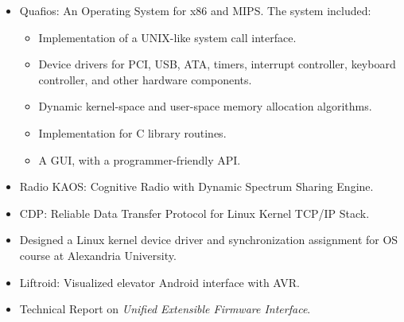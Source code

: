 \documentclass[letterpaper]{twentysecondcv} %
\begin{document}
\begin{itemize}
    \item{Quafios: An Operating System for x86 and MIPS. The system included:
          \begin{itemize}
            \item Implementation of a UNIX-like system call interface.
            \item Device drivers for PCI, USB, ATA, timers, interrupt controller, 
                  keyboard controller, and other hardware components.
            \item Dynamic kernel-space and user-space memory allocation algorithms.
            \item Implementation for C library routines.
            \item A GUI, with a programmer-friendly API.
          \end{itemize}
          }

    \item{Radio KAOS: Cognitive Radio with Dynamic Spectrum Sharing Engine.}
    \item{CDP: Reliable Data Transfer Protocol for Linux Kernel TCP/IP Stack.}
    \item{Designed a Linux kernel device driver and synchronization assignment 
          for OS course at Alexandria University.}
    \item{Liftroid: Visualized elevator Android interface with AVR.}
    \item{Technical Report on \textit{Unified Extensible Firmware Interface}.}
\end{itemize}
\end{document}
